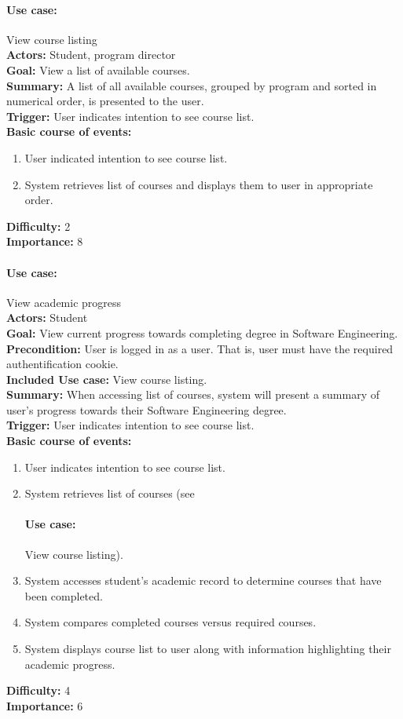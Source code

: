 \documentclass[12pt]{article}
\begin{document}
\paragraph*{Use case:} View course listing\\
\textbf{Actors:} Student, program director\\
\textbf{Goal:} View a list of available courses.\\
\textbf{Summary:} A list of all available courses, grouped by program and sorted in numerical order, is presented to the user.\\
\textbf{Trigger:} User indicates intention to see course list.\\
\textbf{Basic course of events:}
\begin{enumerate}
\item User indicated intention to see course list.
\item System retrieves list of courses and displays them to user in appropriate order.
\end{enumerate}
\textbf{Difficulty:} 2\\
\textbf{Importance:} 8\\


\paragraph*{Use case:} View academic progress\\
\textbf{Actors:} Student\\
\textbf{Goal:} View current progress towards completing degree in Software Engineering.\\
\textbf{Precondition:} User is logged in as a user. That is, user must have the required authentification cookie.\\
\textbf{Included Use case:} View course listing.\\
\textbf{Summary:} When accessing list of courses, system will present a summary of user's progress towards their Software Engineering degree.\\
\textbf{Trigger:} User indicates intention to see course list.\\
\textbf{Basic course of events:}
\begin{enumerate}
\item User indicates intention to see course list.
\item System retrieves list of courses (see \paragraph*{Use case:} View course listing).
\item System accesses student's academic record to determine courses that have been
completed.
\item System compares completed courses versus required courses.
\item System displays course list to user along with information highlighting their
academic progress.
\end{enumerate}
\textbf{Difficulty:} 4\\
\textbf{Importance:} 6\\
\end{document}
